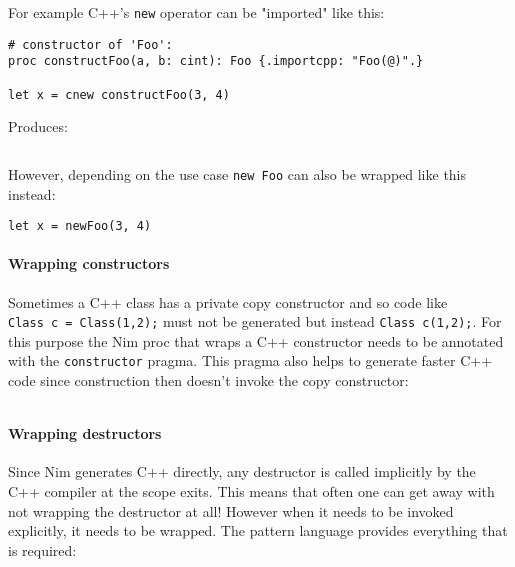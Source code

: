 For example C++'s \texttt{new} operator can be "imported" like this:

\begin{verbatim}
# constructor of 'Foo':
proc constructFoo(a, b: cint): Foo {.importcpp: "Foo(@)".}

let x = cnew constructFoo(3, 4)
\end{verbatim}

Produces:

\begin{verbatim}
\end{verbatim}

However, depending on the use case \texttt{new\ Foo} can also be wrapped
like this instead:

\begin{verbatim}
let x = newFoo(3, 4)
\end{verbatim}

\hypertarget{wrapping-constructors}{%
\paragraph{Wrapping constructors}\label{wrapping-constructors}}

Sometimes a C++ class has a private copy constructor and so code like
\texttt{Class\ c\ =\ Class(1,2);} must not be generated but instead
\texttt{Class\ c(1,2);}. For this purpose the Nim proc that wraps a C++
constructor needs to be annotated with the \texttt{constructor} pragma.
This pragma also helps to generate faster C++ code since construction
then doesn't invoke the copy constructor:

\begin{verbatim}
\end{verbatim}

\hypertarget{wrapping-destructors}{%
\paragraph{Wrapping destructors}\label{wrapping-destructors}}

Since Nim generates C++ directly, any destructor is called implicitly by
the C++ compiler at the scope exits. This means that often one can get
away with not wrapping the destructor at all! However when it needs to
be invoked explicitly, it needs to be wrapped. The pattern language
provides everything that is required:

\begin{verbatim}
\end{verbatim}


